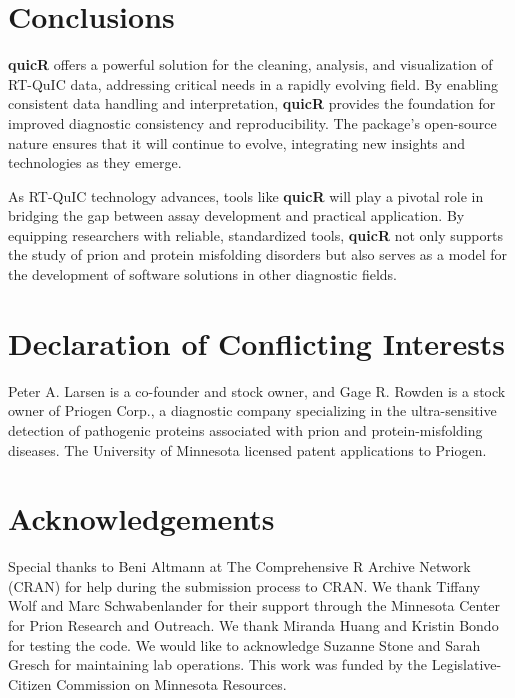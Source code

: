 \documentclass[preprint,12pt,a4paper]{elsarticle}
\begin{document}
    \section{Conclusions} 
        \textbf{quicR} offers a powerful solution for the cleaning, analysis, and visualization of RT-QuIC data, addressing critical needs in a rapidly evolving field. By enabling consistent data handling and interpretation, \textbf{quicR} provides the foundation for improved diagnostic consistency and reproducibility. The package's open-source nature ensures that it will continue to evolve, integrating new insights and technologies as they emerge.

        As RT-QuIC technology advances, tools like \textbf{quicR} will play a pivotal role in bridging the gap between assay development and practical application. By equipping researchers with reliable, standardized tools, \textbf{quicR} not only supports the study of prion and protein misfolding disorders but also serves as a model for the development of software solutions in other diagnostic fields.

    \section*{Declaration of Conflicting Interests}
        Peter A. Larsen is a co-founder and stock owner, and Gage R. Rowden is a stock owner of Priogen Corp., a diagnostic company specializing in the ultra-sensitive detection of pathogenic proteins associated with prion and protein-misfolding diseases. The University of Minnesota licensed patent applications to Priogen.

    \section*{Acknowledgements}
        Special thanks to Beni Altmann at The Comprehensive R Archive Network (CRAN) for help during the submission process to CRAN. We thank Tiffany Wolf and Marc Schwabenlander for their support through the Minnesota Center for Prion Research and Outreach. We thank Miranda Huang and Kristin Bondo for testing the code. We would like to acknowledge Suzanne Stone and Sarah Gresch for maintaining lab operations. This work was funded by the Legislative-Citizen Commission on Minnesota Resources.


     
    
\end{document}
